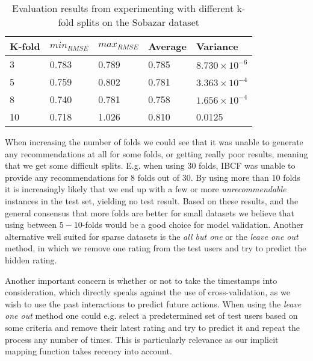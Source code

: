 \begin{table}[H]
\centering
\begin{tabular}{l l l l l }
\toprule
K-fold & 	$min_{RMSE}$ 	&	$max_{RMSE}$ 	& Average 	& Variance 					\\ \midrule
3	   & 	0.783 			& 	0.789 			& 0.785 	& $8.730 \times 10^{-6}$	\\ 
5	   & 	0.759			& 	0.802 			& 0.781 	& $3.363 \times 10^{-4}$ 	\\ 
8	   & 	0.740			& 	0.781			& 0.758 	& $1.656 \times 10^{-4}$ 	\\ 
10	   & 	0.718 			& 	1.026			& 0.810  	& 0.0125					\\
\bottomrule
\end{tabular}
\caption{Evaluation results from experimenting with different k-fold splits on the Sobazar dataset}
\end{table}


When increasing the number of folds we could see that it was unable to generate
any recommendations at all for some folds, or getting really poor results, meaning
that we get some difficult splits. E.g. when using 30 folds, IBCF was unable to
provide any recommendations for 8 folds out of 30. By using more than 10 folds
it is increasingly likely that we end up with a few or more \emph{unrecommendable}
instances in the test set, yielding no test result. Based on these results,
and the general consensus that more folds are better for small datasets we
believe that using between $5-10$-folds would be a good choice for model validation.
Another alternative well suited for sparse datasets is the \emph{all but one} or the
\emph{leave one out} method, in which we remove one rating from the test users
and try to predict the hidden rating.

Another important concern is whether or not to take the timestamps into consideration,
which directly speaks against the use of cross-validation, as we wish to use the past
interactions to predict future actions. When using the \emph{leave one out} method one
could e.g. select a predetermined set of test users based on some criteria and remove
their latest rating and try to predict it and repeat the process any number of times.
This is particularly relevance as our implicit mapping function takes recency into account.


